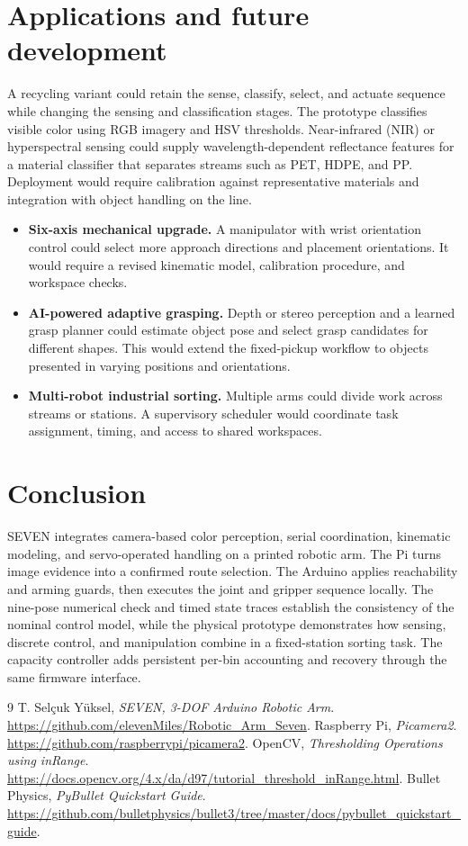 \documentclass[11pt,a4paper]{article}
\begin{document}
\clearpage
\section{Applications and future development}
A recycling variant could retain the sense, classify, select, and actuate sequence while changing the sensing and classification stages. The prototype classifies visible color using RGB imagery and HSV thresholds. Near-infrared (NIR) or hyperspectral sensing could supply wavelength-dependent reflectance features for a material classifier that separates streams such as PET, HDPE, and PP. Deployment would require calibration against representative materials and integration with object handling on the line.

\begin{itemize}
\item \textbf{Six-axis mechanical upgrade.} A manipulator with wrist orientation control could select more approach directions and placement orientations. It would require a revised kinematic model, calibration procedure, and workspace checks.
\item \textbf{AI-powered adaptive grasping.} Depth or stereo perception and a learned grasp planner could estimate object pose and select grasp candidates for different shapes. This would extend the fixed-pickup workflow to objects presented in varying positions and orientations.
\item \textbf{Multi-robot industrial sorting.} Multiple arms could divide work across streams or stations. A supervisory scheduler would coordinate task assignment, timing, and access to shared workspaces.
\end{itemize}

\section{Conclusion}
SEVEN integrates camera-based color perception, serial coordination, kinematic modeling, and servo-operated handling on a printed robotic arm. The Pi turns image evidence into a confirmed route selection. The Arduino applies reachability and arming guards, then executes the joint and gripper sequence locally. The nine-pose numerical check and timed state traces establish the consistency of the nominal control model, while the physical prototype demonstrates how sensing, discrete control, and manipulation combine in a fixed-station sorting task. The capacity controller adds persistent per-bin accounting and recovery through the same firmware interface.

{}
\begin{thebibliography}{9}
\small
{} T. Sel\c{c}uk Y\"uksel, \emph{SEVEN, 3-DOF Arduino Robotic Arm}.
  \url{https://github.com/elevenMiles/Robotic_Arm_Seven}.
 Raspberry Pi, \emph{Picamera2}.
  \url{https://github.com/raspberrypi/picamera2}.
 OpenCV, \emph{Thresholding Operations using inRange}.
  \url{https://docs.opencv.org/4.x/da/d97/tutorial_threshold_inRange.html}.
 Bullet Physics, \emph{PyBullet Quickstart Guide}.
  \url{https://github.com/bulletphysics/bullet3/tree/master/docs/pybullet_quickstart_guide}.
\end{thebibliography}
\end{document}
